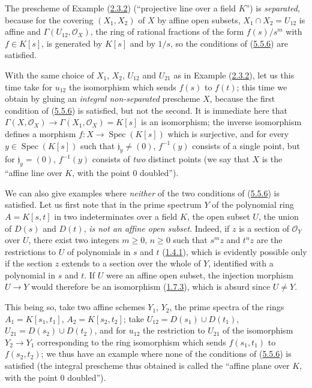\begin{examples}[5.5.11]
\label{I.5.5.11}
The prescheme of Example (\hyperref[I.2.3.2]{2.3.2})
(``projective line over a field $K$'') is \emph{separated}, because for the
covering $(X_1,X_2)$ of $X$ by affine open subsets,
$X_1\cap X_2=U_{12}$ is affine and $\Gamma(U_{12},\mathscr{O}_X)$, the ring of
rational fractions of the form $f(s)/s^m$ with $f\in K[s]$, is generated
by $K[s]$ and by $1/s$, so the conditions of
(\hyperref[I.5.5.6]{5.5.6}) are satisfied.

With the same choice of $X_1$, $X_2$, $U_{12}$ and $U_{21}$ as in Example
(\hyperref[I.2.3.2]{2.3.2}), let us this time take for $u_{12}$
the isomorphism which sends $f(s)$ to $f(t)$; this time we obtain
by gluing an \emph{integral non-separated} prescheme $X$, because the first
condition of (\hyperref[I.5.5.6]{5.5.6}) is satisfied, but not the second.
It is immediate here that
$\Gamma(X,\mathscr{O}_X)\to\Gamma(X_1,\mathscr{O}_X)=K[s]$ is an
isomorphism; the inverse isomorphism defines a morphism
$f:X\to\operatorname{Spec}(K[s])$ which is surjective, and for every
$y\in\operatorname{Spec}(K[s])$ such that $\mathfrak{j}_y\neq(0)$,
$f^{-1}(y)$ consists of a single point, but for $\mathfrak{j}_y=(0)$,
$f^{-1}(y)$ consists of \emph{two} distinct points (we say that $X$ is the
``affine line over $K$, with the point $0$ doubled'').

We can also give examples where \emph{neither} of the two conditions of
(\hyperref[I.5.5.6]{5.5.6}) is satisfied. Let us first note that in the
prime spectrum $Y$ of the polynomial ring $A=K[s,t]$ in two indeterminates
over a field $K$, the open subset $U$, the union of $D(s)$ and $D(t)$,
\emph{is not an affine open subset}. Indeed, if $z$ is a section of
$\mathscr{O}_Y$ over $U$, there exist two integers $m\geq0$, $n\geq0$ such
that $s^m z$ and $t^n z$ are the restrictions to $U$ of polynomials in $s$
and $t$ (\hyperref[I.1.4.1]{1.4.1}), which is evidently possible only if
the section $z$ extends to a section over the whole of $Y$,
identified with a polynomial in $s$ and $t$. If $U$ were an affine open
subset, the injection morphism $U\to Y$ would therefore be an isomorphism
(\hyperref[I.1.7.3]{1.7.3}), which is absurd since $U\neq Y$.

This being so, take two affine schemes $Y_1$, $Y_2$, the prime spectra of
the rings $A_1=K[s_1,t_1]$, $A_2=K[s_2,t_2]$; take
$U_{12}=D(s_1)\cup D(t_1)$, $U_{21}=D(s_2)\cup D(t_2)$, and for $u_{12}$ the
restriction to $U_{21}$ of the isomorphism $Y_2\to Y_1$ corresponding to
the ring isomorphism which sends $f(s_1,t_1)$ to $f(s_2,t_2)$;
we thus have an example where none of the conditions of
(\hyperref[I.5.5.6]{5.5.6}) is satisfied (the integral prescheme thus
obtained is called the ``affine plane over $K$, with the point $0$
doubled'').
\end{examples}

